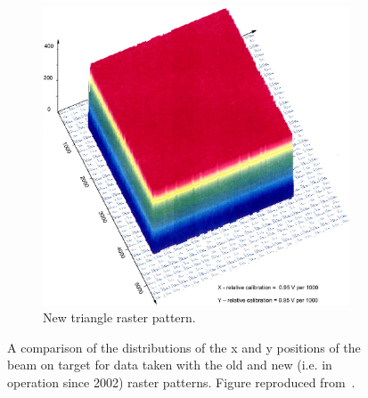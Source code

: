 \begin{figure}[h]
\begin{subfigure}[b]{0.4\textwidth}
        \includegraphics[width=\textwidth]{chap3/triangle_raster_colz.jpg}
        \caption{New triangle raster pattern.}
        \label{fig:triangle_raster}
    \end{subfigure}
    \caption{A comparison of the distributions of the x and y positions of the
             beam on target for data taken with the old and new (i.e. in
             operation since 2002) raster patterns. Figure reproduced
             from~\cite{Yan_2005}.}
    \label{fig:raster_comparison}
\end{figure}

